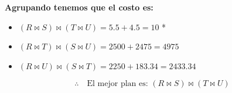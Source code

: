 \documentclass{templateNote}
\begin{document}
\begin{enumerate}
\begin{enumerate}[label=\arabic*)]
        \textbf{Agrupando tenemos que el costo es:}
        \begin{itemize}
            \item $(R \Join S) \Join (T \Join U) = 5.5 + 4.5 = 10$ *
            \item $(R \Join T) \Join (S \Join U) = 2500 + 2475 = 4975$
            \item $(R \Join U) \Join (S \Join T) = 2250 + 183.34 = 2433.34$
        \end{itemize}

        \begin{equation*}
            \therefore \quad \text{El mejor plan es: } (R \Join S) \Join (T \Join U)
        \end{equation*}
    \end{enumerate}

\end{enumerate}
\end{document}
